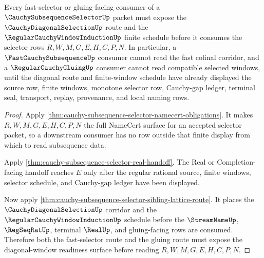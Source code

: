 \begin{theorem}
\label{thm:cauchy-subsequence-selector-diagonal-window-readiness}
Every fast-selector or gluing-facing consumer of a $\CauchySubsequenceSelectorUp$ packet must expose the $\CauchyDiagonalSelectionUp$ route and the $\RegularCauchyWindowInductionUp$ finite schedule before it consumes the selector rows $R,W,M,G,E,H,C,P,N$. In particular, a $\FastCauchySubsequenceUp$ consumer cannot read the fast cofinal corridor, and a $\RegularCauchyGluingUp$ consumer cannot read compatible selected windows, until the diagonal route and finite-window schedule have already displayed the source row, finite windows, monotone selector row, Cauchy-gap ledger, terminal seal, transport, replay, provenance, and local naming rows.
\end{theorem}
\begin{proof}
Apply \autoref{thm:cauchy-subsequence-selector-namecert-obligations}. It makes $R,W,M,G,E,H,C,P,N$ the full NameCert surface for an accepted selector packet, so a downstream consumer has no row outside that finite display from which to read subsequence data.

Apply \autoref{thm:cauchy-subsequence-selector-real-handoff}. The Real or Completion-facing handoff reaches $E$ only after the regular rational source, finite windows, selector schedule, and Cauchy-gap ledger have been displayed.

Now apply \autoref{thm:cauchy-subsequence-selector-sibling-lattice-route}. It places the $\CauchyDiagonalSelectionUp$ corridor and the $\RegularCauchyWindowInductionUp$ schedule before the $\StreamNameUp$, $\RegSeqRatUp$, terminal $\RealUp$, and gluing-facing rows are consumed. Therefore both the fast-selector route and the gluing route must expose the diagonal-window readiness surface before reading $R,W,M,G,E,H,C,P,N$.
\end{proof}

